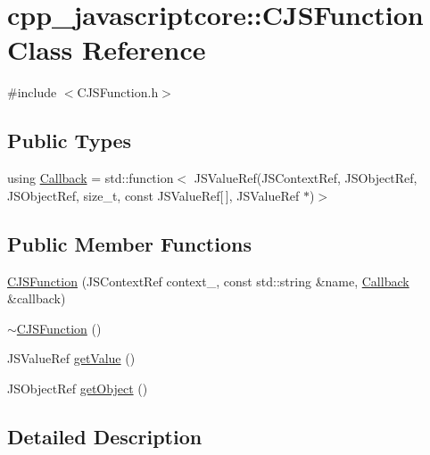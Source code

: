 \hypertarget{classcpp__javascriptcore_1_1_c_j_s_function}{}\section{cpp\+\_\+javascriptcore\+:\+:C\+J\+S\+Function Class Reference}
\label{classcpp__javascriptcore_1_1_c_j_s_function}


{\ttfamily \#include $<$C\+J\+S\+Function.\+h$>$}

\subsection*{Public Types}
\begin{DoxyCompactItemize}
\item 
using \mbox{\hyperlink{classcpp__javascriptcore_1_1_c_j_s_function_a3cf83c4e33bfeafbe770047bb75556f5}{Callback}} = std\+::function$<$ J\+S\+Value\+Ref(J\+S\+Context\+Ref, J\+S\+Object\+Ref, J\+S\+Object\+Ref, size\+\_\+t, const J\+S\+Value\+Ref\mbox{[}$\,$\mbox{]}, J\+S\+Value\+Ref $\ast$)$>$
\end{DoxyCompactItemize}
\subsection*{Public Member Functions}
\begin{DoxyCompactItemize}
\item 
\mbox{\hyperlink{classcpp__javascriptcore_1_1_c_j_s_function_a8d6cf6e461f0ba2fa1d644b68bedfb93}{C\+J\+S\+Function}} (J\+S\+Context\+Ref context\+\_\+, const std\+::string \&name, \mbox{\hyperlink{classcpp__javascriptcore_1_1_c_j_s_function_a3cf83c4e33bfeafbe770047bb75556f5}{Callback}} \&callback)
\item 
\mbox{\hyperlink{classcpp__javascriptcore_1_1_c_j_s_function_a63c255cdc25861aed7259a972ac97159}{$\sim$\+C\+J\+S\+Function}} ()
\item 
J\+S\+Value\+Ref \mbox{\hyperlink{classcpp__javascriptcore_1_1_c_j_s_function_aa20026ff5ca7485db637b004316094f6}{get\+Value}} ()
\item 
J\+S\+Object\+Ref \mbox{\hyperlink{classcpp__javascriptcore_1_1_c_j_s_function_a573f590c9ce8f1efd6c8db875846d9f5}{get\+Object}} ()
\end{DoxyCompactItemize}


\subsection{Detailed Description}


